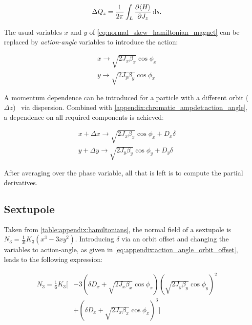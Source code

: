 \begin{equation}
  \Delta Q_z = \frac{1}{2 \pi} \int_L \frac{\partial \langle H \rangle}{\partial J_z} \mathop{}\!\mathrm{d} s.
\end{equation}

The usual variables $x$ and $y$ of \cref{eq:normal_skew_hamiltonian_magnet} can be replaced by
\textit{action-angle} variables to introduce the action:

\begin{equation}
  \begin{aligned}
    x \rightarrow \sqrt{2J_x \beta_x} \cos{\phi_x} \\
    y \rightarrow \sqrt{2J_y \beta_y} \cos{\phi_x}
  \end{aligned}
  \label{appendix:chromatic_ampdet:action_angle}
\end{equation}

A momentum dependence can be introduced for a particle with a different orbit
($\Delta z$)~\cite{wiedemann_particle_1999} via dispersion. Combined with
\cref{appendix:chromatic_ampdet:action_angle}, a dependence on all required components is achieved:

\begin{equation}
  \begin{aligned}
    x + \Delta x \rightarrow \sqrt{2J_x \beta_x} \cos{\phi_x} + D_x \delta \\
    y + \Delta y \rightarrow \sqrt{2J_y \beta_y} \cos{\phi_y} + D_y \delta
  \end{aligned}
  \label{eq:appendix:action_angle_orbit_offset}
\end{equation}


After averaging over the phase variable, all that is left is to compute the partial derivatives.



\subsection{Sextupole}

Taken from \cref{table:appendix:hamiltonians}, the normal field of a sextupole is
$N_3 = \frac{1}{3!} K_3 (x^3 - 3xy^2)$.
Introducing $\delta$ via an orbit offset and changing the variables to action-angle, as given in
\cref{eq:appendix:action_angle_orbit_offset}, leads to the following expression:

\begin{equation}
  \begin{aligned}
    N_3 = \frac{1}{6} K_3 \biggl[
        &- 3\left(\delta D_x + \sqrt{2J_{x} \beta_{x}} \cos{\phi_{x}}\right) \left(\sqrt{2 J_{y} \beta_{y}} \cos \phi_y \right)^2 \\
        &+ \left(\delta D_x + \sqrt{2 J_{x} \beta_{x}} \cos{\phi_{x}}\right)^{3}
    \biggr]
    \end{aligned}
\end{equation}


